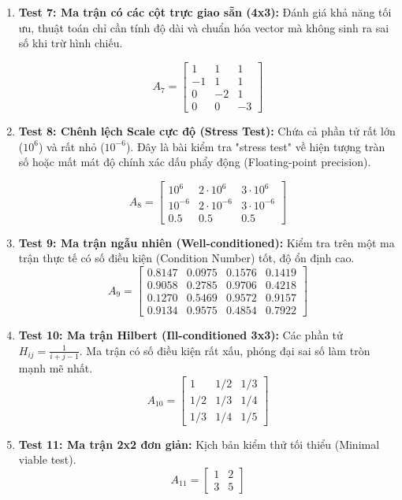 \begin{enumerate}
    \item \textbf{Test 7: Ma trận có các cột trực giao sẵn (4x3):} Đánh giá khả năng tối ưu, thuật toán chỉ cần tính độ dài và chuẩn hóa vector mà không sinh ra sai số khi trừ hình chiếu.

    $$ A_7 = \begin{bmatrix} 1 & 1 & 1 \\ -1 & 1 & 1 \\ 0 & -2 & 1 \\ 0 & 0 & -3 \end{bmatrix} $$

    \item \textbf{Test 8: Chênh lệch Scale cực độ (Stress Test):} Chứa cả phần tử rất lớn ($10^6$) và rất nhỏ ($10^{-6}$). Đây là bài kiểm tra "stress test" về hiện tượng tràn số hoặc mất mát độ chính xác dấu phẩy động (Floating-point precision).

    $$ A_8 = \begin{bmatrix} 10^6 & 2\cdot 10^6 & 3\cdot 10^6 \\ 10^{-6} & 2\cdot 10^{-6} & 3\cdot 10^{-6} \\ 0.5 & 0.5 & 0.5 \end{bmatrix} $$

    \item \textbf{Test 9: Ma trận ngẫu nhiên (Well-conditioned):} Kiểm tra trên một ma trận thực tế có số điều kiện (Condition Number) tốt, độ ổn định cao.
    $$ A_9 = \begin{bmatrix} 0.8147 & 0.0975 & 0.1576 & 0.1419 \\ 0.9058 & 0.2785 & 0.9706 & 0.4218 \\ 0.1270 & 0.5469 & 0.9572 & 0.9157 \\ 0.9134 & 0.9575 & 0.4854 & 0.7922 \end{bmatrix} $$

    \item \textbf{Test 10: Ma trận Hilbert (Ill-conditioned 3x3):} Các phần tử $H_{ij} = \frac{1}{i+j-1}$. Ma trận có số điều kiện rất xấu, phóng đại sai số làm tròn mạnh mẽ nhất.
    $$ A_{10} = \begin{bmatrix} 1 & 1/2 & 1/3 \\ 1/2 & 1/3 & 1/4 \\ 1/3 & 1/4 & 1/5 \end{bmatrix} $$

    \item \textbf{Test 11: Ma trận 2x2 đơn giản:} Kịch bản kiểm thử tối thiểu (Minimal viable test).
    $$ A_{11} = \begin{bmatrix} 1 & 2 \\ 3 & 5 \end{bmatrix} $$


\end{enumerate}
